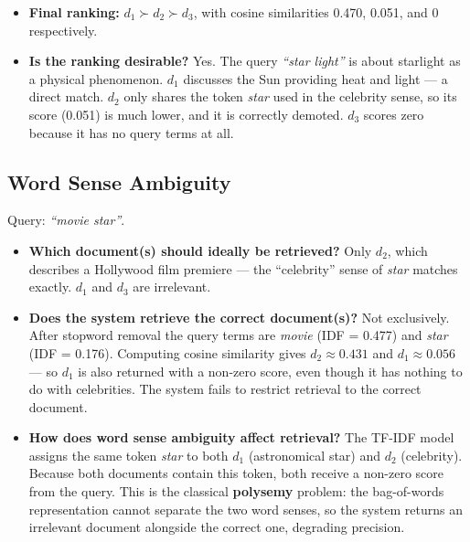 \documentclass{svproc}
\begin{document}
    \begin{itemize}[noitemsep]
        \item \textbf{Final ranking:} $d_1 \succ d_2 \succ d_3$, with cosine similarities 0.470, 0.051, and 0 respectively.
        \item \textbf{Is the ranking desirable?} Yes. The query \textit{``star light''} is about starlight as a physical phenomenon. $d_1$ discusses the Sun providing heat and light — a direct match. $d_2$ only shares the token \textit{star} used in the celebrity sense, so its score (0.051) is much lower, and it is correctly demoted. $d_3$ scores zero because it has no query terms at all.
    \end{itemize}

    \subsection{Word Sense Ambiguity}

    Query: \textit{``movie star''}.

    \begin{itemize}[noitemsep]
        \item \textbf{Which document(s) should ideally be retrieved?} Only $d_2$, which describes a Hollywood film premiere --- the ``celebrity'' sense of \textit{star} matches exactly. $d_1$ and $d_3$ are irrelevant.

        \item \textbf{Does the system retrieve the correct document(s)?} Not exclusively. After stopword removal the query terms are \textit{movie} (IDF = 0.477) and \textit{star} (IDF = 0.176). Computing cosine similarity gives $d_2 \approx 0.431$ and $d_1 \approx 0.056$ --- so $d_1$ is also returned with a non-zero score, even though it has nothing to do with celebrities. The system fails to restrict retrieval to the correct document.

        \item \textbf{How does word sense ambiguity affect retrieval?} The TF-IDF model assigns the same token \textit{star} to both $d_1$ (astronomical star) and $d_2$ (celebrity). Because both documents contain this token, both receive a non-zero score from the query. This is the classical \textbf{polysemy} problem: the bag-of-words representation cannot separate the two word senses, so the system returns an irrelevant document alongside the correct one, degrading precision.
    \end{itemize}

    \FloatBarrier
\end{document}
